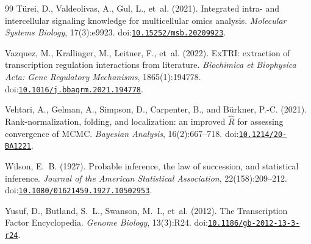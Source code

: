 \documentclass[11pt,a4paper]{article}
\begin{document}
\begin{thebibliography}{99}
T{\"u}rei, D., Valdeolivas, A., Gul, L., et~al. (2021).
\newblock Integrated intra- and intercellular signaling knowledge for multicellular omics analysis.
\newblock \emph{Molecular Systems Biology}, 17(3):e9923.
\newblock doi:\href{https://doi.org/10.15252/msb.20209923}{\nolinkurl{10.15252/msb.20209923}}.

Vazquez, M., Krallinger, M., Leitner, F., et~al. (2022).
\newblock ExTRI: extraction of transcription regulation interactions from literature.
\newblock \emph{Biochimica et Biophysica Acta: Gene Regulatory Mechanisms}, 1865(1):194778.
\newblock doi:\href{https://doi.org/10.1016/j.bbagrm.2021.194778}{\nolinkurl{10.1016/j.bbagrm.2021.194778}}.

Vehtari, A., Gelman, A., Simpson, D., Carpenter, B., and B{\"u}rkner, P.-C. (2021).
\newblock Rank-normalization, folding, and localization: an improved $\widehat{R}$ for assessing convergence of {MCMC}.
\newblock \emph{Bayesian Analysis}, 16(2):667--718.
\newblock doi:\href{https://doi.org/10.1214/20-BA1221}{\nolinkurl{10.1214/20-BA1221}}.

Wilson, E.~B. (1927).
\newblock Probable inference, the law of succession, and statistical inference.
\newblock \emph{Journal of the American Statistical Association}, 22(158):209--212.
\newblock doi:\href{https://doi.org/10.1080/01621459.1927.10502953}{\nolinkurl{10.1080/01621459.1927.10502953}}.

Yusuf, D., Butland, S.~L., Swanson, M.~I., et~al. (2012).
\newblock The Transcription Factor Encyclopedia.
\newblock \emph{Genome Biology}, 13(3):R24.
\newblock doi:\href{https://doi.org/10.1186/gb-2012-13-3-r24}{\nolinkurl{10.1186/gb-2012-13-3-r24}}.

\end{thebibliography}
\end{document}
